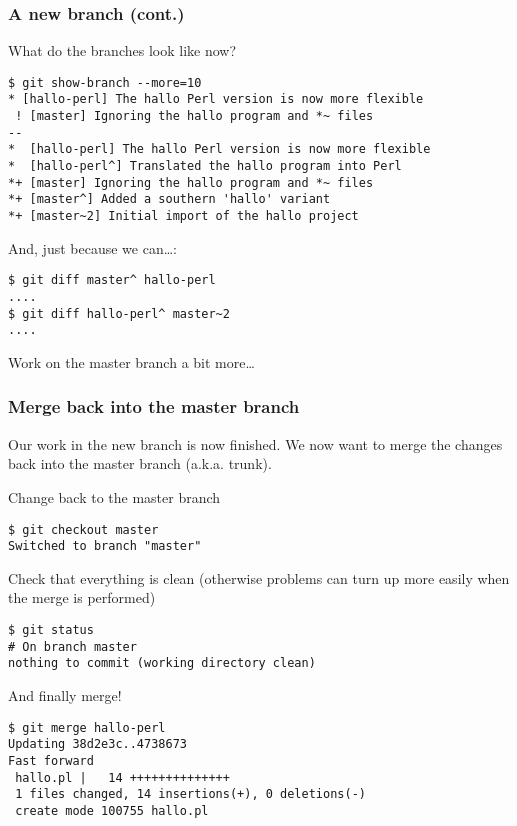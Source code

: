 \begin{frame}[fragile]
\frametitle{A new branch (cont.)}

What do the branches look like now?
\begin{lstlisting}[basicstyle=\tiny\ttfamily\color{black}]
$ git show-branch --more=10
* [hallo-perl] The hallo Perl version is now more flexible
 ! [master] Ignoring the hallo program and *~ files
--
*  [hallo-perl] The hallo Perl version is now more flexible
*  [hallo-perl^] Translated the hallo program into Perl
*+ [master] Ignoring the hallo program and *~ files
*+ [master^] Added a southern 'hallo' variant
*+ [master~2] Initial import of the hallo project
\end{lstlisting}

And, just because we can\ldots:
\begin{lstlisting}[basicstyle=\tiny\ttfamily\color{black}]
$ git diff master^ hallo-perl
....
$ git diff hallo-perl^ master~2
....
\end{lstlisting}

Work on the master branch a bit more\ldots
 
\end{frame}

\begin{frame}[fragile]
\frametitle{Merge back into the master branch}

Our work in the new branch is now finished.  We now want to merge the
changes back into the master branch (a.k.a. trunk).

Change back to the master branch
\begin{lstlisting}[basicstyle=\tiny\ttfamily\color{black}]
$ git checkout master
Switched to branch "master"
\end{lstlisting}

Check that everything is clean (otherwise problems can turn up more easily
when the merge is performed)
\begin{lstlisting}[basicstyle=\tiny\ttfamily\color{black}]
$ git status
# On branch master
nothing to commit (working directory clean)
\end{lstlisting}

And finally merge!
\begin{lstlisting}[basicstyle=\tiny\ttfamily\color{black}]
$ git merge hallo-perl
Updating 38d2e3c..4738673
Fast forward
 hallo.pl |   14 ++++++++++++++
 1 files changed, 14 insertions(+), 0 deletions(-)
 create mode 100755 hallo.pl
\end{lstlisting}
\end{frame}

